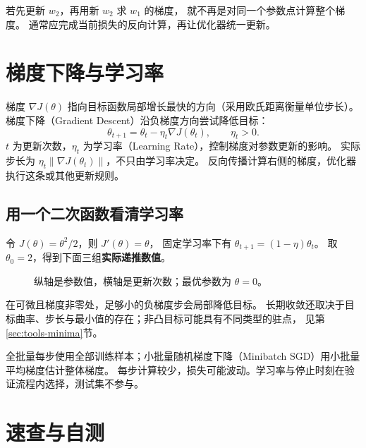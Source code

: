 \begin{pitfall}[在同一个参数点计算梯度]
若先更新 $w_2$，再用新 $w_2$ 求 $w_1$ 的梯度，
就不再是对同一个参数点计算整个梯度。
通常应完成当前损失的反向计算，再让优化器统一更新。
\end{pitfall}

\section{梯度下降与学习率}
\label{sec:nn-gd}

梯度 $\nabla J(\theta)$ 指向目标函数局部增长最快的方向（采用欧氏距离衡量单位步长）。
梯度下降（Gradient Descent）沿负梯度方向尝试降低目标：
\begin{equation}
 \boxed{\theta_{t+1}=\theta_t-\eta_t\nabla J(\theta_t)},\qquad \eta_t>0.
 \label{eq:gd}
\end{equation}
$t$ 为更新次数，$\eta_t$ 为学习率（Learning Rate），控制梯度对参数更新的影响。
实际步长为 $\eta_t\|\nabla J(\theta_t)\|$，不只由学习率决定。
反向传播计算右侧的梯度，优化器执行这条或其他更新规则。

\subsection{用一个二次函数看清学习率}
令 $J(\theta)=\theta^2/2$，则 $J'(\theta)=\theta$，
固定学习率下有 $\theta_{t+1}=(1-\eta)\theta_t$。
取 $\theta_0=2$，得到下面三组\textbf{实际递推数值}。

\begin{figure}[htbp]
\centering

\caption{纵轴是参数值，横轴是更新次数；最优参数为 $\theta=0$。}
\label{fig:learning-rate}
\par\smallskip
{}
\end{figure}

在可微且梯度非零处，足够小的负梯度步会局部降低目标。
长期收敛还取决于目标曲率、步长与最小值的存在；非凸目标可能具有不同类型的驻点，
见第\ref{sec:tools-minima}节。

\begin{keyidea}[从全批量到小批量]
全批量每步使用全部训练样本；小批量随机梯度下降（Minibatch SGD）用小批量平均梯度估计整体梯度。
每步计算较少，损失可能波动。学习率与停止时刻在验证流程内选择，测试集不参与。
\end{keyidea}

\section{速查与自测}
\label{sec:nn-summary}

